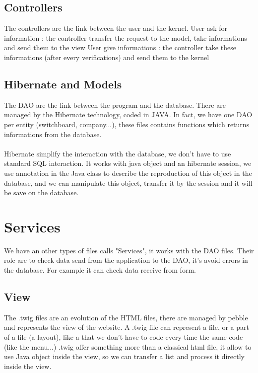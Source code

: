 \subsection{Controllers}

The controllers are the link between the user and the kernel.
User ask for information : the controller transfer the request to the model, take informations and send them to the view
User give informations : the controller take these informations (after every verifications) and send them to the kernel


\subsection{Hibernate and Models}

The DAO are the link between the program and the database. There are managed by the Hibernate technology, coded in JAVA.
In fact, we have one DAO per entity (switchboard, company...), these files contains functions which returns informations from the database.
\\
\\
Hibernate simplify the interaction with the database, we don't have to use standard SQL interaction.
It works with java object and an hibernate session, we use annotation in the Java class to describe the reproduction of this object in the database,
and we can manipulate this object, transfer it by the session and it will be save on the database.

\section{Services}

We have an other types of files calls "Services", it works with the DAO files.
Their role are to check data send from the application to the DAO, it's avoid errors in the database.
For example it can check data receive from form.


\subsection{View}

The .twig files are an evolution of the HTML files, there are managed by pebble and represents the view of the website.
A .twig file can represent a file, or a part of a file (a layout), like a that we don't have to code every time the same code (like the menu...)
.twig offer something more than a classical html file, it allow to use Java object inside the view, so we can transfer a list and process it directly inside the view.


